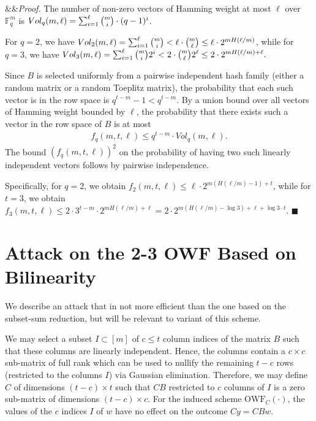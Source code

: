 \documentclass[orivec,envcountsect]{llncs}
\renewenvironment{proof}[1][]
    {\noindent
       \ifx&#1&{\it Proof.}
       \else{\it Proof ({#1}).}
       \fi}{\hfill $\blacksquare$}
\newcommand{\OWF}{\text{OWF}}
\begin{document}
\begin{proof}The number of non-zero vectors of Hamming weight at most $\ell$ over $\mathbb{F}_q^m$ is
$Vol_q(m,\ell) = \sum_{i=1}^\ell \tbinom{m}{i} \cdot (q-1)^{i}$.

For $q = 2$, we have
$Vol_2(m,\ell) = \sum_{i=1}^\ell \tbinom{m}{i} <
\ell \cdot \tbinom{m}{\ell} \leq
\ell \cdot 2^{m H(\ell/m)}$, while for $q = 3$, we have
$Vol_3(m,\ell) = \sum_{i=1}^\ell \tbinom{m}{i} 2^i <
2 \cdot \tbinom{m}{\ell} 2^\ell \leq
2 \cdot 2^{m H(\ell/m) + \ell}.$

Since $B$ is selected uniformly from a pairwise independent hash family (either a random matrix or a random Toeplitz matrix),
the probability that each such vector is in the row space is $q^{t-m} - 1 < q^{t-m}$. By a union bound over all vectors of Hamming weight bounded by $\ell$, the probability that there exists such a vector in the row space of $B$ is at most
\begin{align*}
f_q(m,t,\ell) \leq q^{t-m} \cdot Vol_q(m,\ell).
\end{align*}
The bound $(f_q(m,t,\ell))^2$ on the probability of having two such linearly independent vectors follows by pairwise independence.

Specifically, for $q = 2$, we obtain
$f_2(m,t,\ell) \leq \ell \cdot 2^{m (H(\ell/m) - 1) + t}$,
while for $t = 3$, we obtain
$f_3(m,t,\ell) \leq 2 \cdot 3^{t-m} \cdot 2^{m H(\ell/m) + \ell} = 2 \cdot 2^{m (H(\ell/m) - \log 3) + \ell + \log 3 \cdot t}$.
\end{proof}



\section{Attack on the 2-3 OWF Based on Bilinearity}
\label{app:bilinearity}

We describe an attack that in not more efficient than the one based on the subset-sum reduction, but will be relevant to variant of this scheme.


We may select a subset $I \subset [m]$ of $c \leq t$ column indices of the matrix $B$ such that these columns are linearly independent. Hence, the columns contain a $c \times c$ sub-matrix of full rank which can be used to nullify the remaining $t-c$ rows (restricted to the columns $I$) via Gaussian elimination. Therefore, we may define $C$ of dimensions $(t-c) \times t$ such that $CB$ restricted to $c$ columns of $I$ is a zero sub-matrix of dimensions $(t-c) \times c$. For the induced scheme $\OWF_C(\cdot)$, the values of the $c$ indices $I$ of $w$ have no effect on the outcome $Cy = CBw$.
\end{document}
